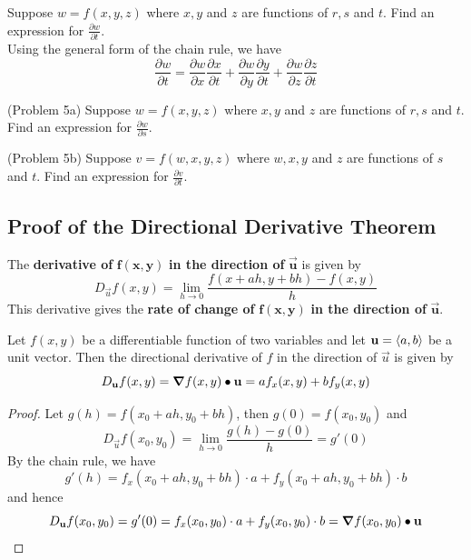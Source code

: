 \documentclass[handout]{ximera}
\begin{document}
\begin{example}[Example 5]
Suppose $w = f(x, y, z)$ where $x, y$ and $z$ are functions of $r, s$ and $t$. 
Find an expression for $\frac{\partial w}{\partial t}$.\\
Using the general form of the chain rule, we have
\[
\frac{\partial w}{\partial t}= \frac{\partial w}{\partial x}\frac{\partial x}{\partial t}+\frac{\partial w}{\partial y}\frac{\partial y}{\partial t}
+\frac{\partial w}{\partial z}\frac{\partial z}{\partial t}
\]
\end{example}

\begin{problem}(Problem 5a)
Suppose $w = f(x, y, z)$ where $x, y$ and $z$ are functions of $r, s$ and $t$. 
Find an expression for $\frac{\partial w}{\partial s}$.
\end{problem}

\begin{problem}(Problem 5b)
Suppose $v = f(w, x, y, z)$ where $w, x, y$ and $z$ are functions of $s$ and $t$. 
Find an expression for $\frac{\partial v}{\partial t}$.
\end{problem}

\subsection{Proof of the Directional Derivative Theorem}
\begin{definition}
The \textbf{derivative of} $\mathbf{f(x,y)}$ \textbf{in the direction of} 
$\mathbf{\vec u}$ is given by
\[
D_{\vec u} f(x,y) = \lim_{h \to 0} \frac{f(x + ah, y + bh) -f(x,y)}{h}
\]
This derivative gives the \textbf{rate of change of} $\mathbf{f(x,y)}$ 
\textbf{in the direction of} $\mathbf{\vec u}$.
\end{definition}
\begin{theorem}
Let $f(x,y)$ be a differentiable function of two variables 
and let $\mathbf u = \left\langle a,b\right\rangle$ be a unit vector.
Then the directional derivative of $f$ in the direction of $\vec u$ is given by
\[
D_{\mathbf u} f(x,y) = \boldsymbol\nabla f(x,y) \bullet \mathbf u = af_x(x,y) + bf_y(x,y)
\]
\end{theorem}
\begin{proof}
Let $g(h) = f(x_0 + ah, y_0 + bh)$, then $g(0) = f(x_0,y_0)$ and
\[
D_{\vec u} f(x_0,y_0) = \lim_{h \to 0} \frac{g(h) - g(0)}{h} = g'(0)
\]
By the chain rule, we have
\[
g'(h) = f_x(x_0 + ah, y_0 + bh) \cdot a + f_y(x_0 + ah, y_0 + bh) \cdot b
\]
and hence
\[
D_{\mathbf u} f(x_0,y_0) = g'(0) =
f_x(x_0, y_0) \cdot a + f_y(x_0, y_0) \cdot b = \boldsymbol\nabla f(x_0,y_0) \bullet \mathbf u
\]

\end{proof}
\end{document}
